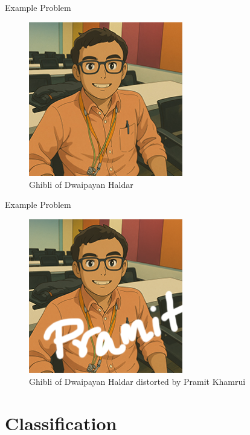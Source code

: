 \documentclass{beamer}
\begin{document}
\begin{frame}{Example Problem}
    \begin{figure}[h]
        \centering
        \includegraphics[width=0.6\textwidth]{Image_ghibli.jpg} %
        \caption{Ghibli of Dwaipayan Haldar}
    \end{figure}
\end{frame}

\begin{frame}{Example Problem}
    \begin{figure}[h]
        \centering
        \includegraphics[width=0.6\textwidth]{Image_ghibli_Pramit.png} %
        \caption{Ghibli of Dwaipayan Haldar distorted by Pramit Khamrui}
    \end{figure}
\end{frame}

\section{Classification}
\end{document}

